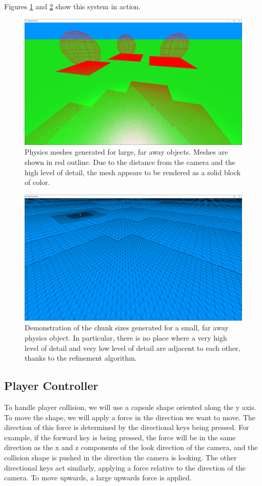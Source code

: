 \documentclass{article}
\begin{document}
Figures \ref{fig:meshes2} and \ref{fig:meshes3} show this system in action.

\begin{figure}[H]
  \includegraphics[width=\textwidth]{meshes2.png}
  \caption{Physics meshes generated for large, far away objects. Meshes are shown in red outline. Due to the distance from the camera and the high level of detail, the mesh appears to be rendered as a solid block of color.}
  \label{fig:meshes2}
\end{figure}

\begin{figure}[H]
  \includegraphics[width=\textwidth]{meshes3.png}
  \caption{Demonstration of the chunk sizes generated for a small, far away physics object. In particular, there is no place where a very high level of detail and very low level of detail are adjacent to each other, thanks to the refinement algorithm.}
  \label{fig:meshes3}
\end{figure}

\subsection{Player Controller}
To handle player collision, we will use a capsule shape oriented along the y axis. To move the shape, we will apply a force in the direction we want to move. The direction of this force is determined by the directional keys being pressed. For example, if the forward key is being pressed, the force will be in the same direction as the x and z components of the look direction of the camera, and the collision shape is pushed in the direction the camera is looking. The other directional keys act similarly, applying a force relative to the direction of the camera. To move upwards, a large upwards force is applied. 
\end{document}
